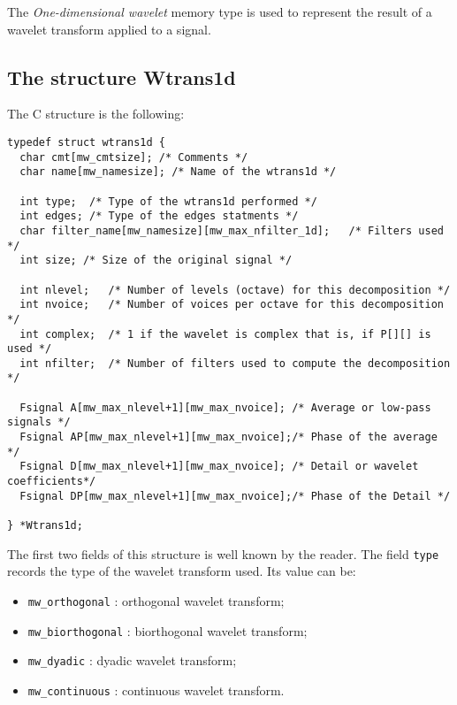 \label{wavelets_wtrans1d}

The {\em One-dimensional wavelet} memory type is used to represent the result
of a wavelet transform applied to a signal.

\subsection{The structure Wtrans1d}
\label{wavelets_wtrans1d_structure}

\def\wtransud{{\tt Wtrans1d }}
\index{structure!\wtrand1d@\wtransud}

The C structure is the following:
{\small
\begin{verbatim}
typedef struct wtrans1d {
  char cmt[mw_cmtsize]; /* Comments */
  char name[mw_namesize]; /* Name of the wtrans1d */

  int type;  /* Type of the wtrans1d performed */
  int edges; /* Type of the edges statments */
  char filter_name[mw_namesize][mw_max_nfilter_1d];   /* Filters used */
  int size; /* Size of the original signal */

  int nlevel;   /* Number of levels (octave) for this decomposition */
  int nvoice;   /* Number of voices per octave for this decomposition */
  int complex;  /* 1 if the wavelet is complex that is, if P[][] is used */
  int nfilter;  /* Number of filters used to compute the decomposition */

  Fsignal A[mw_max_nlevel+1][mw_max_nvoice]; /* Average or low-pass signals */
  Fsignal AP[mw_max_nlevel+1][mw_max_nvoice];/* Phase of the average */
  Fsignal D[mw_max_nlevel+1][mw_max_nvoice]; /* Detail or wavelet coefficients*/
  Fsignal DP[mw_max_nlevel+1][mw_max_nvoice];/* Phase of the Detail */

} *Wtrans1d;
\end{verbatim}
}

The first two fields of this structure is well known by the reader.
The field \verb+type+ records the type of the wavelet transform used.
Its value can be:
\begin{itemize}
\item \verb+mw_orthogonal+ : orthogonal wavelet transform;
\item \verb+mw_biorthogonal+ : biorthogonal wavelet transform;
\item \verb+mw_dyadic+ : dyadic wavelet transform;
\item \verb+mw_continuous+ : continuous wavelet transform.
\end{itemize}

